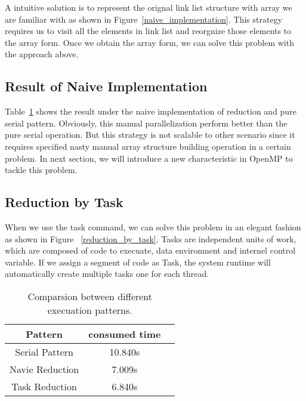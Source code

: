 \documentclass[10pt,twocolumn,letterpaper]{article}
\begin{document}
    A intuitive solution is to represent the orignal
    link list structure with array we are familiar with as shown in 
    Figure~\ref{naive_implementation}. This strategy requires us to 
    visit all the elements in link list and reorgnize 
    those elements to the array form. Once we obtain the array form, we 
    can solve this problem with the approach above. 

    
    \subsection{Result of Naive Implementation}
    Table~\ref{naive_serial} shows the result under 
    the naive implementation of reduction and pure serial 
    pattern. Obviously, this manual parallelization perform better 
    than the pure serial operation. But this strategy is not 
    scalable to other scenario since it requires specified nasty manual
    array structure building operation in a certain problem. In
    next section, we will introduce a new characteristic in
    OpenMP to tackle this problem. 

    \subsection{Reduction by Task}
    When we use the task command, we can solve this problem 
    in an elegant fashion as shown in Figure ~\ref{reduction_by_task}.
    Tasks are independent units of work, which are composed of
    code to execuate, data environment and internel control 
    variable. If we assign a segment of code as Task, the system 
    runtime will automatically create multiple tasks one for each
    thread. 
 

    \begin{table}
        \begin{center}
        \begin{tabular}{|c|c|c|}
        \hline
        Pattern &  consumed time\\
        \hline
        Serial Pattern & 10.840s \\
        Navie Reduction & 7.009s \\
        Task Reduction &  6.840s\\
        \hline
        \end{tabular}
        \end{center}
        \caption{Comparsion between different execuation patterns.}
        \label{naive_serial}
    \end{table}
\end{document}
